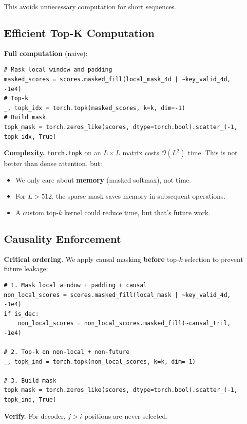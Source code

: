 This avoids unnecessary computation for short sequences.

\subsection{Efficient Top-K Computation}

\textbf{Full computation} (naive):

\begin{lstlisting}
# Mask local window and padding
masked_scores = scores.masked_fill(local_mask_4d | ~key_valid_4d, -1e4)
# Top-k
_, topk_idx = torch.topk(masked_scores, k=k, dim=-1)
# Build mask
topk_mask = torch.zeros_like(scores, dtype=torch.bool).scatter_(-1, topk_idx, True)
\end{lstlisting}

\textbf{Complexity.} \texttt{torch.topk} on an $L \times L$ matrix costs 
$\mathcal{O}(L^2)$ time. This is not better than dense attention, but:

\begin{itemize}
\item We only care about \textbf{memory} (masked softmax), not time.
\item For $L > 512$, the sparse mask saves memory in subsequent operations.
\item A custom top-$k$ kernel could reduce time, but that's future work.

\end{itemize}
\subsection{Causality Enforcement}

\textbf{Critical ordering.} We apply causal masking \textbf{before} top-$k$ selection 
to prevent future leakage:

\begin{lstlisting}
# 1. Mask local window + padding + causal
non_local_scores = scores.masked_fill(local_mask | ~key_valid_4d, -1e4)
if is_dec:
    non_local_scores = non_local_scores.masked_fill(~causal_tril, -1e4)

# 2. Top-k on non-local + non-future
_, topk_ind = torch.topk(non_local_scores, k=k, dim=-1)

# 3. Build mask
topk_mask = torch.zeros_like(scores, dtype=torch.bool).scatter_(-1, topk_ind, True)
\end{lstlisting}

\textbf{Verify.} For decoder, $j > i$ positions are never selected.

